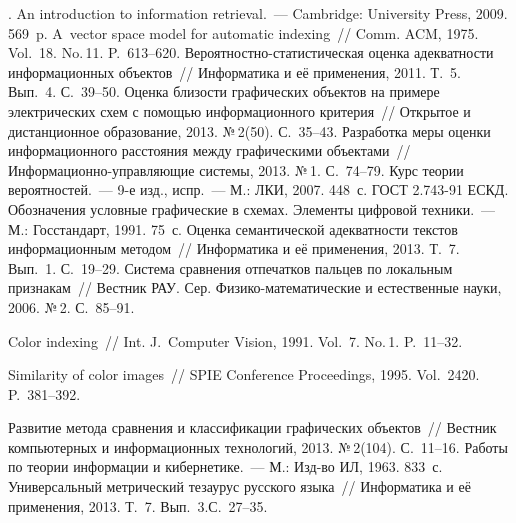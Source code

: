 \begin{multicols}{2}
{\small\frenchspacing
{%
\begin{thebibliography}{99}
. An introduction to
information retrieval.~--- Cambridge: University Press, 2009. 569~p.
 A~vector space model for automatic
indexing~// Comm. ACM, 1975. Vol.~18. No.\,11. P.~613--620.
 Веро\-ят\-ност\-но-ста\-ти\-сти\-че\-ская оценка
адекватности информационных объектов~// Информатика и её применения,
2011. Т.~5. Вып.~4. С.~39--50.
 Оценка близости
графических объектов на примере электрических схем с помощью
информационного критерия~// Открытое и дистанционное образование, 2013.
№\,2(50). С.~35--43.
 Разработка меры оценки информационного
расстояния между графическими объектами~//
Ин\-фор\-ма\-ци\-он\-но-управ\-ля\-ющие сис\-те\-мы, 2013. №\,1. С.~74--79.
 Курс теории вероятностей.~--- 9-е изд., испр.~---
М.: ЛКИ, 2007. 448~с.
ГОСТ 2.743-91 ЕСКД. Обозначения условные графические в схемах. Элементы
цифровой техники.~--- М.: Госстандарт, 1991. 75~с.
 Оценка семантической адекватности
текстов информационным методом~// Информатика и её применения, 2013.
Т.~7. Вып.~1. С.~19--29.
 Система сравнения отпечатков пальцев
по локальным признакам~// Вестник РАУ. Сер.
Фи\-зи\-ко-ма\-те\-ма\-ти\-че\-ские и естественные науки, 2006. №\,2. С.~85--91.

 Color indexing~// Int. J.~Computer Vision, 1991.
Vol.~7. No.\,1. P.~11--32.

 Similarity of color images~// SPIE Conference
Proceedings, 1995. Vol.~2420. P.~381--392.

 Развитие метода сравнения и
классификации графических объектов~// Вестник компьютерных и
информационных технологий, 2013. №\,2(104). С.~11--16.
 Работы по теории информации и кибернетике.~--- М.: Изд-во
ИЛ, 1963. 833~с.
 Универсальный
метрический тезаурус русского языка~// Информатика и её применения,
2013. Т.~7. Вып.~3.\linebreak С.~27--35.

\end{thebibliography}
} }

\end{multicols}


